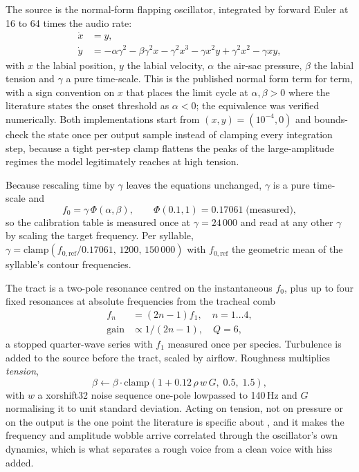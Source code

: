 \documentclass[10pt,twocolumn,a4paper]{article}
\begin{document}
The source is the normal-form flapping oscillator, integrated by forward Euler at 16 to 64
times the audio rate:
\begin{align}
\dot{x} &= y, \\
\dot{y} &= -\alpha\gamma^{2} - \beta\gamma^{2}x - \gamma^{2}x^{3} - \gamma x^{2}y
           + \gamma^{2}x^{2} - \gamma xy ,
\end{align}
with $x$ the labial position, $y$ the labial velocity, $\alpha$ the air-sac pressure, $\beta$
the labial tension and $\gamma$ a pure time-scale. This is the published normal form term for
term, with a sign convention on $x$ that places the limit cycle at $\alpha, \beta > 0$ where
the literature states the onset threshold as $\alpha < 0$; the equivalence was verified
numerically. Both implementations start from $(x, y) = (10^{-4}, 0)$ and bounds-check the
state once per output sample instead of clamping every integration step, because a tight
per-step clamp flattens the peaks of the large-amplitude regimes the model legitimately
reaches at high tension.

Because rescaling time by $\gamma$ leaves the equations unchanged, $\gamma$ is a pure
time-scale and
\begin{equation}
f_0 = \gamma \, \Phi(\alpha, \beta), \qquad \Phi(0.1, 1) = 0.17061 \;\text{(measured)},
\end{equation}
so the calibration table is measured once at $\gamma = 24\,000$ and read at any other $\gamma$
by scaling the target frequency. Per syllable, $\gamma = \mathrm{clamp}(f_{0,\mathrm{ref}} /
0.17061,\, 1200,\, 150\,000)$ with $f_{0,\mathrm{ref}}$ the geometric mean of the syllable's
contour frequencies.

The tract is a two-pole resonance centred on the instantaneous $f_0$, plus up to four fixed
resonances at absolute frequencies from the tracheal comb
\begin{equation}
\begin{split}
f_n &= (2n-1) f_1, \quad n = 1 \ldots 4,\\
\text{gain} &\propto 1/(2n-1), \quad Q = 6,
\end{split}
\end{equation}
a stopped quarter-wave series with $f_1$ measured once per species. Turbulence is added to the
source before the tract, scaled by airflow. Roughness multiplies \emph{tension},
\begin{equation}
\beta \leftarrow \beta \cdot \mathrm{clamp}\!\left(1 + 0.12\,\rho\, w\, G,\; 0.5,\; 1.5\right),
\end{equation}
with $w$ a xorshift32 noise sequence one-pole lowpassed to 140\,Hz and $G$ normalising it to
unit standard deviation. Acting on tension, not on pressure or on the output is the
one point the literature is specific about \citep{amador2021}, and it makes the frequency and
amplitude wobble arrive correlated through the oscillator's own dynamics, which is what
separates a rough voice from a clean voice with hiss added.
\end{document}
